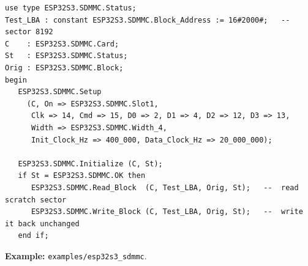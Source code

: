 \begin{lstlisting}
use type ESP32S3.SDMMC.Status;
Test_LBA : constant ESP32S3.SDMMC.Block_Address := 16#2000#;   --  sector 8192
C    : ESP32S3.SDMMC.Card;
St   : ESP32S3.SDMMC.Status;
Orig : ESP32S3.SDMMC.Block;
begin
   ESP32S3.SDMMC.Setup
     (C, On => ESP32S3.SDMMC.Slot1,
      Clk => 14, Cmd => 15, D0 => 2, D1 => 4, D2 => 12, D3 => 13,
      Width => ESP32S3.SDMMC.Width_4,
      Init_Clock_Hz => 400_000, Data_Clock_Hz => 20_000_000);

   ESP32S3.SDMMC.Initialize (C, St);
   if St = ESP32S3.SDMMC.OK then
      ESP32S3.SDMMC.Read_Block  (C, Test_LBA, Orig, St);   --  read scratch sector
      ESP32S3.SDMMC.Write_Block (C, Test_LBA, Orig, St);   --  write it back unchanged
   end if;
\end{lstlisting}

\noindent\textbf{Example:} \texttt{examples/esp32s3\_sdmmc}.
